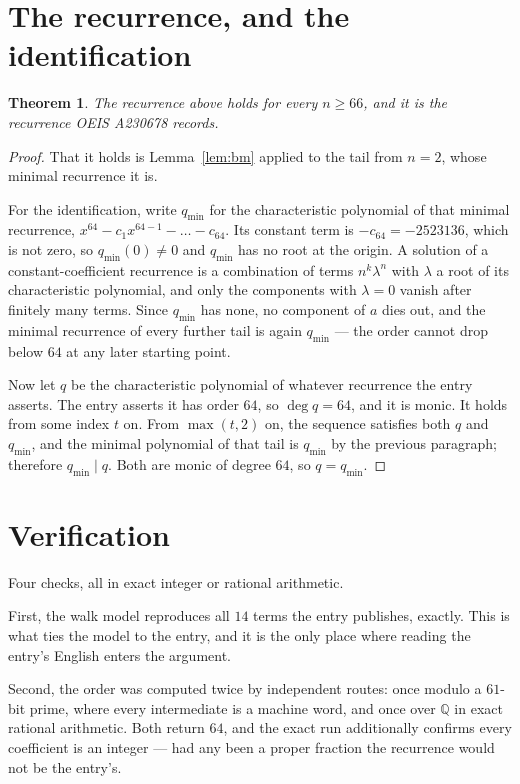 \documentclass[11pt,a4paper]{article}
\theoremstyle{plain}
\newtheorem{theorem}{Theorem}
\theoremstyle{definition}
\begin{document}
\section{The recurrence, and the identification}

\begin{theorem}
The recurrence above holds for every $n\ge66$, and it is the recurrence OEIS A230678 records.
\end{theorem}

\begin{proof}
That it holds is Lemma~\ref{lem:bm} applied to the tail from $n=2$, whose minimal
recurrence it is.

For the identification, write $q_{\min}$ for the characteristic polynomial of that minimal
recurrence, $x^{64}-c_1x^{64-1}-\dots-c_{64}$. Its constant term is
$-c_{64}=-2523136$, which is not zero, so $q_{\min}(0)\neq0$ and $q_{\min}$ has no
root at the origin. A solution of a constant-coefficient recurrence is a combination of terms
$n^{k}\lambda^{n}$ with $\lambda$ a root of its characteristic polynomial, and only the
components with $\lambda=0$ vanish after finitely many terms. Since $q_{\min}$ has none, no
component of $a$ dies out, and the minimal recurrence of every further tail is again
$q_{\min}$ --- the order cannot drop below $64$ at any later starting point.

Now let $q$ be the characteristic polynomial of whatever recurrence the entry asserts. The
entry asserts it has order $64$, so $\deg q=64$, and it is monic. It holds from some
index $t$ on. From $\max(t,2)$ on, the sequence satisfies both $q$ and $q_{\min}$, and
the minimal polynomial of that tail is $q_{\min}$ by the previous paragraph; therefore
$q_{\min}\mid q$. Both are monic of degree $64$, so $q=q_{\min}$.
\end{proof}

\section{Verification}

Four checks, all in exact integer or rational arithmetic.

First, the walk model reproduces all $14$ terms the entry publishes, exactly. This is
what ties the model to the entry, and it is the only place where reading the entry's English
enters the argument.

Second, the order was computed twice by independent routes: once modulo a $61$-bit prime, where
every intermediate is a machine word, and once over $\mathbb{Q}$ in exact rational arithmetic.
Both return $64$, and the exact run additionally confirms every coefficient is an integer
--- had any been a proper fraction the recurrence would not be the entry's.
\end{document}

